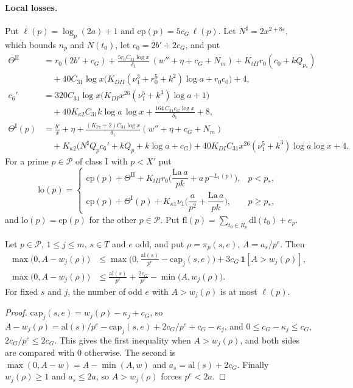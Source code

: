 \paragraph{Local losses.} Put $\ell(p)=\log_p(2a)+1$ and $\mathrm{cp}(p)=5c_G\,\ell(p)$. Let $N^\sharp=2x^{2+8\varepsilon}$, which bounds $n_p$ and $N(t_0)$, let $c_0=2b'+2c_G$, and put
\begin{align*}
\Theta^{\mathrm{II}}&=r_0(2b'+c_G)+\frac{5r_0C_{31}\log x}{\delta_1}\,(w''+\eta+c_G+N_m)+K_{tII}r_0(c_0+kQ_{p_*})\\ &\quad {}+40C_{31}\log x\big(K_{DII}(\nu_1^3+r_0^5+k^2)\log a+r_0c_0\big)+4,\\
c_6'&=320C_{31}\log x\big(K_{DI}x^{26}(\nu_1^5+k^3)\log a+1\big)\\ &\quad {}+40K_{\kappa2}C_{31}k\log a\,\log x+\frac{164\,C_{31}c_G\log x}{\delta_1}+8,\\
\Theta^{\mathrm I}(p)&=\frac{b'}x+\eta+\frac{(K_{\mathrm{Pr}}+2)C_{31}\log x}{\delta_1}(w''+\eta+c_G+N_m)\\ &\quad {}+K_{\kappa2}\big(N^\sharp Q_pc_6'+kQ_p+k\log a+c_G\big)+40K_{DI}C_{31}x^{26}(\nu_1^5+k^3)\log a\log x+4 .
\end{align*}
For a prime $p\in\mathcal P$ of class I with $p<X'$ put
\[
\mathrm{lo}(p)=\begin{cases}\mathrm{cp}(p)+\Theta^{\mathrm{II}}+K_{tII}r_0\Big(\dfrac{\mathrm{La}\,a}{pk}+a\,p^{-L_1(p)}\Big),&p<p_*,\\[1.5ex]
\mathrm{cp}(p)+\Theta^{\mathrm I}(p)+K_{\kappa1}\nu_1\Big(\dfrac a{p^2}+\dfrac{\mathrm{La}\,a}{pk}\Big),&p\ge p_*,\end{cases}
\]
and $\mathrm{lo}(p)=\mathrm{cp}(p)$ for the other $p\in\mathcal P$. Put $\mathrm{fl}(p)=\sum_{t_0\in R_p}\mathrm{dl}(t_0)+e_p$.

\begin{lemma}\label{r2:shift}
Let $p\in\mathcal P$, $1\le j\le m$, $s\in T$ and $e$ odd, and put $\rho=\pi_p(s,e)$, $A=a_s/p^e$. Then
\[
\begin{aligned}
\max\big(0,A-w_j(\rho)\big)&\le\max\Big(0,\frac{\mathrm{al}(s)}{p^e}-\mathrm{cap}_j(s,e)\Big)+3c_G\,\mathbf 1[A>w_j(\rho)],\\ \max\big(0,A-w_j(\rho)\big)&\le\frac{\mathrm{al}(s)}{p^e}+\frac{2c_G}{p^e}-\min\big(A,w_j(\rho)\big).
\end{aligned}
\]
For fixed $s$ and $j$, the number of odd $e$ with $A>w_j(\rho)$ is at most $\ell(p)$.
\end{lemma}

\begin{proof}
$\mathrm{cap}_j(s,e)=w_j(\rho)-\kappa_j+c_G$, so $A-w_j(\rho)=\mathrm{al}(s)/p^e-\mathrm{cap}_j(s,e)+2c_G/p^e+c_G-\kappa_j$, and $0\le c_G-\kappa_j\le c_G$, $2c_G/p^e\le2c_G$. This gives the first inequality when $A>w_j(\rho)$, and both sides are compared with $0$ otherwise. The second is $\max(0,A-w)=A-\min(A,w)$ and $a_s=\mathrm{al}(s)+2c_G$. Finally $w_j(\rho)\ge1$ and $a_s\le2a$, so $A>w_j(\rho)$ forces $p^e<2a$.
\end{proof}

